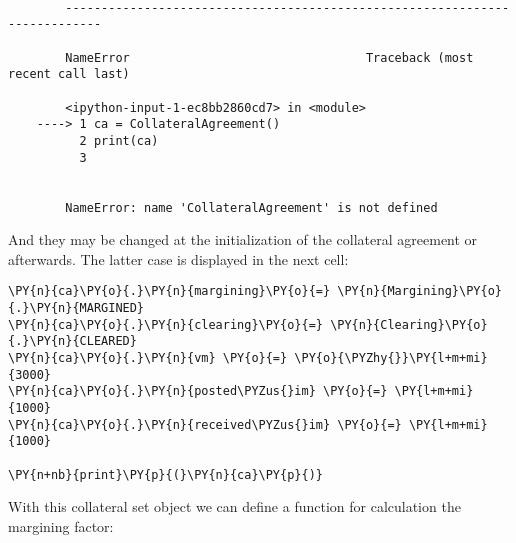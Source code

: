     \begin{Verbatim}[commandchars=\\\{\}]

        ---------------------------------------------------------------------------

        NameError                                 Traceback (most recent call last)

        <ipython-input-1-ec8bb2860cd7> in <module>
    ----> 1 ca = CollateralAgreement()
          2 print(ca)
          3 
    

        NameError: name 'CollateralAgreement' is not defined

    \end{Verbatim}

    And they may be changed at the initialization of the collateral
agreement or afterwards. The latter case is displayed in the next cell:

    \begin{tcolorbox}[breakable, size=fbox, boxrule=1pt, pad at break*=1mm,colback=cellbackground, colframe=cellborder]
\begin{Verbatim}[commandchars=\\\{\}]
\PY{n}{ca}\PY{o}{.}\PY{n}{margining}\PY{o}{=} \PY{n}{Margining}\PY{o}{.}\PY{n}{MARGINED}
\PY{n}{ca}\PY{o}{.}\PY{n}{clearing}\PY{o}{=} \PY{n}{Clearing}\PY{o}{.}\PY{n}{CLEARED}
\PY{n}{ca}\PY{o}{.}\PY{n}{vm} \PY{o}{=} \PY{o}{\PYZhy{}}\PY{l+m+mi}{3000}
\PY{n}{ca}\PY{o}{.}\PY{n}{posted\PYZus{}im} \PY{o}{=} \PY{l+m+mi}{1000}
\PY{n}{ca}\PY{o}{.}\PY{n}{received\PYZus{}im} \PY{o}{=} \PY{l+m+mi}{1000}

\PY{n+nb}{print}\PY{p}{(}\PY{n}{ca}\PY{p}{)}
\end{Verbatim}
\end{tcolorbox}

    With this collateral set object we can define a function for calculation
the margining factor:

